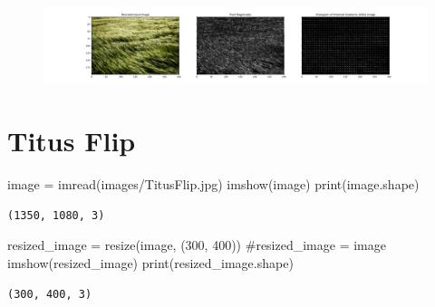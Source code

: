 \documentclass[
  letterpaper,
  DIV=11,
  numbers=noendperiod]{scrreprt}
\newenvironment{Shaded}{\begin{snugshade}}{\end{snugshade}}
\newcommand{\BuiltInTok}[1]{\textcolor[rgb]{0.00,0.23,0.31}{#1}}
\newcommand{\CommentTok}[1]{\textcolor[rgb]{0.37,0.37,0.37}{#1}}
\newcommand{\DecValTok}[1]{\textcolor[rgb]{0.68,0.00,0.00}{#1}}
\newcommand{\NormalTok}[1]{\textcolor[rgb]{0.00,0.23,0.31}{#1}}
\newcommand{\OperatorTok}[1]{\textcolor[rgb]{0.37,0.37,0.37}{#1}}
\newcommand{\StringTok}[1]{\textcolor[rgb]{0.13,0.47,0.30}{#1}}
\begin{document}
\begin{figure}[H]

{\centering \includegraphics{results_files/figure-pdf/unnamed-chunk-18-6.pdf}

}

\end{figure}

\hypertarget{titus-flip}{%
\section{Titus Flip}\label{titus-flip}}

\begin{Shaded}
\begin{Highlighting}[]
\NormalTok{image }\OperatorTok{=}\NormalTok{ imread(}\StringTok{\textquotesingle{}images/TitusFlip.jpg\textquotesingle{}}\NormalTok{)}
\NormalTok{imshow(image)}
\BuiltInTok{print}\NormalTok{(image.shape)}
\end{Highlighting}
\end{Shaded}

\begin{verbatim}
(1350, 1080, 3)
\end{verbatim}

\begin{Shaded}
\begin{Highlighting}[]
\NormalTok{resized\_image }\OperatorTok{=}\NormalTok{ resize(image, (}\DecValTok{300}\NormalTok{, }\DecValTok{400}\NormalTok{))}
\CommentTok{\#resized\_image = image}
\NormalTok{imshow(resized\_image)}
\BuiltInTok{print}\NormalTok{(resized\_image.shape)}
\end{Highlighting}
\end{Shaded}

\begin{verbatim}
(300, 400, 3)
\end{verbatim}
\end{document}
